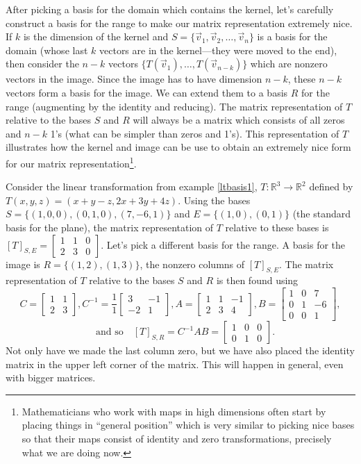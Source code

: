 After picking a basis for the domain which contains the kernel, let's carefully construct a basis for the range to make our matrix representation extremely nice.  
If $k$ is the dimension of the kernel and $S=\{\vec v_1,\vec v_2,\ldots,\vec v_n\}$ is a basis for the domain (whose last $k$ vectors are in the kernel---they were moved to the end), then consider the $n-k$ vectors $\{T(\vec v_{1}),\ldots,T(\vec v_{n-k})\}$ which are nonzero vectors in the image.  Since the image has to have dimension $n-k$, these $n-k$ vectors form a basis for the image. We can extend them to a basis $R$ for the range (augmenting by the identity and reducing). The matrix representation of $T$ relative to the bases $S$ and $R$ will always be a matrix which consists of all zeros and $n-k$ 1's (what can be simpler than zeros and 1's).  This representation of $T$ illustrates how the kernel and image can be use to obtain an extremely nice form for our matrix representation\footnote{Mathematicians who work with maps in high dimensions often start by placing things in ``general position'' which is very similar to picking nice bases so that their maps consist of identity and zero transformations, precisely what we are doing now.}.



\begin{example}
Consider the linear transformation from example \ref{ltbasis1}, $T\colon{\mathbb{R}}^3\to {\mathbb{R}}^2$ defined by $T(x,y,z)=(x+y-z,2x+3y+4z)$. Using the bases $S=\{(1,0,0),(0,1,0),(7,-6,1)\}$ and $E=\{(1,0),(0,1)\}$ (the standard basis for the plane), the matrix representation of $T$ relative to these bases is  
$[T]_{S,E} = \begin{bmatrix}
 1 & 1 &0\\
 2 & 3 &0
\end{bmatrix}$. 
Let's pick a different basis for the range.  A basis for the image is $R = \{(1,2),(1,3)\}$, the nonzero columns of $[T]_{S,E}$. 
The matrix representation of $T$ relative to the bases $S$ and $R$ is then found using 
$$C=
\begin{bmatrix}
1 & 1\\
2 & 3
\end{bmatrix},
C^{-1} = 
\frac{1}{1}
\begin{bmatrix}
3 & -1\\
-2 & 1
\end{bmatrix},
A=
\begin{bmatrix}
 1 & 1 & -1 \\
 2 & 3 & 4
\end{bmatrix}, 
B=
\begin{bmatrix}
 1 & 0 &7\\
 0 & 1 &-6\\
 0 & 0 &1
\end{bmatrix},
$$
$$
\quad \text {and so} \quad 
[T]_{S,R} =C^{-1}AB= 
\begin{bmatrix}
 1 & 0 & 0 \\
 0 & 1 & 0
\end{bmatrix} .$$ 
Not only have we made the last column zero, but we have also placed the identity matrix in the upper left corner of the matrix. This will happen in general, even with bigger matrices.
\end{example}

